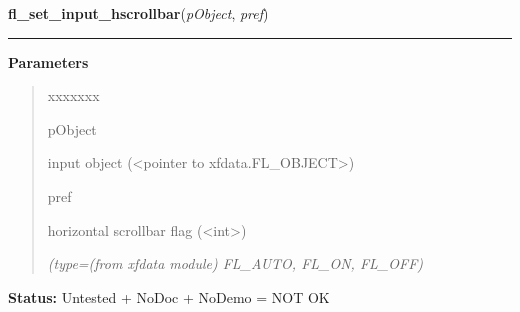 \hspace{.8\funcindent}\begin{boxedminipage}{\funcwidth}

    \raggedright \textbf{fl\_set\_input\_hscrollbar}(\textit{pObject}, \textit{pref})

    \vspace{-1.5ex}

    \rule{\textwidth}{0.5\fboxrule}
\setlength{\parskip}{2ex}
\setlength{\parskip}{1ex}
      \textbf{Parameters}
      \vspace{-1ex}

      \begin{quote}
        \begin{Ventry}{xxxxxxx}

          \item[pObject]

          input object ({\textless}pointer to 
          xfdata.FL\_OBJECT{\textgreater})

          \item[pref]

          horizontal scrollbar flag ({\textless}int{\textgreater})

            {\it (type=(from xfdata module) FL\_AUTO, FL\_ON, FL\_OFF)}

        \end{Ventry}

      \end{quote}

\textbf{Status:} Untested + NoDoc + NoDemo = NOT OK



    \end{boxedminipage}

    \label{xformslib:library:fl_set_input_vscrollbar}

    \vspace{0.5ex}

